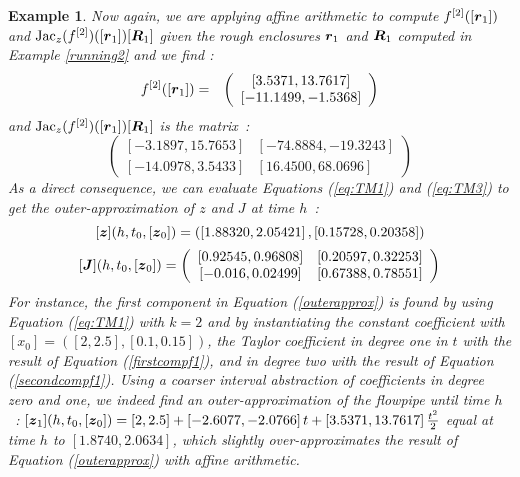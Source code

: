 \documentclass{sig-alternate-05-2015}
\newcommand\ForAuthors[1]%
 {\par\smallskip                     %
  \begin{center}%
   \fbox%
   {\parbox{0.9\linewidth}%
    {\raggedright\sc--- #1}%
   }%
  \end{center}%
  \par\smallskip                     %
 }
\newtheorem{example}{Example}
\def\intvl#1{\mbox{$[ #1 ]$}}
\begin{document}
\begin{example}
Now again, we are applying affine arithmetic to compute 
$f^{[2]}([{\r}_{1}])$ and $\mbox{Jac}_z(f^{[2]})([{\r}_{1}]) [\bfm{R}_{1}]$
given the rough enclosures $\r_1$ and $\bfm{R}_1$ computed in Example
\ref{running2} and we find : 
\begin{eqnarray}
f^{[2]}([{\r}_{1}]) & = & \left(\begin{array}{c}
\left[    3.5371,   13.7617\right] \\
\left[  -11.1499,   -1.5368\right]
\end{array}\right)
\label{secondcompf1}
\end{eqnarray}
and $\mbox{Jac}_z(f^{[2]})([{\r}_{1}]) [\bfm{R}_{1}]$ is the matrix~: 
$$
\left(\begin{array}{cc}
\left[   -3.1897,   15.7653\right] & \left[  -74.8884,  -19.3243\right] \\
\left[  -14.0978,    3.5433\right] & \left[   16.4500,   68.0696\right]
\end{array}\right)
$$
As a direct consequence, we can evaluate Equations (\ref{eq:TM1}) and (\ref{eq:TM3}) to get the outer-approximation of $z$ and $J$ at time $h$~: 
\begin{equation}
\intvl{\z}(h,t_0,[{\z}_0]) = \left(\left[1.88320, 2.05421\right], \left[0.15728, 0.20358\right]\right) 
\label{outerapprox}
\end{equation}
\begin{equation}
\intvl{\J}(h,t_0,[{\z}_0]) = \left(\begin{array}{cc}
\left[0.92545, 0.96808\right] & \left[0.20597, 0.32253\right] \\
\left[-0.016, 0.02499\right] & \left[0.67388, 0.78551\right]
\end{array}\right)
\label{outerapproxJ}
\end{equation}
For instance, the first component in Equation (\ref{outerapprox}) is found by using Equation (\ref{eq:TM1}) with
$k=2$ and by instantiating the constant coefficient with
$\intvl{x_0}=\left(\left[2,2.5\right], \left[0.1,0.15\right]\right)$, the Taylor coefficient in degree one in $t$ 
with the result of Equation (\ref{firstcompf1}), and in degree two with the result of Equation 
(\ref{secondcompf1}). Using a coarser interval abstraction of coefficients in degree zero and one, we indeed
find an outer-approximation of the flowpipe until time $h$~: 
$\intvl{\z_1}(h,t_0,[{\z}_0]) = \left[2,2.5\right]+\left[-2.6077,-2.0766\right]t
+\left[    3.5371,   13.7617\right]
\frac{t^2}{2}$
\noindent equal at time $h$ to $\left[1.8740,2.0634\right]$, 
which slightly over-approximates the result of Equation (\ref{outerapprox}) with affine arithmetic. 
\end{example}
\end{document}
